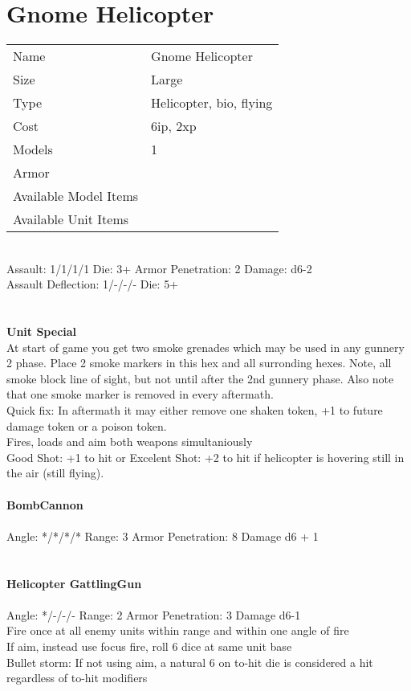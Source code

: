 \pagebreak

\section{ Gnome Helicopter }

\begin{tabular}{ll}
  Name & Gnome Helicopter \\
  Size & Large\\
  Type & Helicopter, bio, flying\\
  Cost & 6ip, 2xp\\
  Models & 1\\
  Armor & \\
  Available Model Items &  \\
  Available Unit Items &  \\
\end{tabular}

\ \\
Assault: 1/1/1/1 Die: 3+ Armor Penetration: 2 Damage: d6-2 \\
Assault Deflection: 1/-/-/- Die: 5+\\
\indent  \\
\ \\

{\bf Unit Special} \\
At start of game you get two smoke grenades which may be used in any gunnery 2 phase. Place 2 smoke markers in this hex and all surronding hexes. Note, all smoke block line of sight, but not until after the 2nd gunnery phase. Also note that one smoke marker is removed in every aftermath. \\ Quick fix: In aftermath it may either remove one shaken token, +1 to future damage token or a poison token.\\ Fires, loads and aim both weapons simultaniously \\ Good Shot: +1 to hit or Excelent Shot: +2 to hit if helicopter is hovering still in the air (still flying).
\ \\
\ \\
{\bf BombCannon } \\
\ \\
Angle: */*/*/* Range: 3 Armor Penetration: 8 Damage d6 + 1 \\
\indent  \\



\ \\
{\bf Helicopter GattlingGun } \\
\ \\
Angle: */-/-/- Range: 2 Armor Penetration: 3 Damage d6-1 \\
\indent Fire once at all enemy units within range and within one angle of fire \\ If aim, instead use focus fire, roll 6 dice at same unit base\\ Bullet storm: If not using aim, a natural 6 on to-hit die is considered a hit regardless of to-hit modifiers \\





